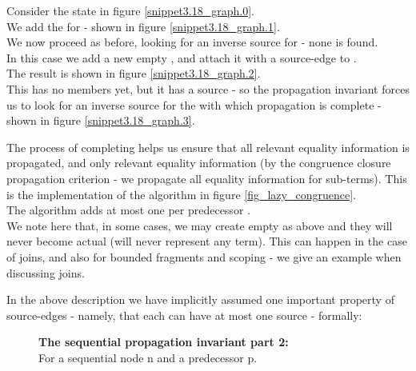 \bigskip
\noindent
Consider the state in figure \ref{snippet3.18_graph.0}.\\
We add the \GT{} for  - shown in figure \ref{snippet3.18_graph.1}.\\
We now proceed as before, looking for an inverse source for  - none is found.\\
In this case we add a new empty \GT{}, and attach it with a source-edge to .\\
The result is shown in figure \ref{snippet3.18_graph.2}.\\
This \GT{} has no members yet, but it has a source - so the propagation invariant forces us to look for an inverse source for the \GFA{} 
 with which propagation is complete - shown in figure \ref{snippet3.18_graph.3}.

\bigskip
\noindent
The process of completing \GFAs{} helps us ensure that all relevant equality information is propagated, and only relevant equality information (by the congruence closure propagation criterion - we propagate all equality information for sub-terms). This is the implementation of the algorithm in figure \ref{fig_lazy_congruence}.\\
The algorithm adds at most one \GT{} per predecessor \GT{}.\\
We note here that, in some cases, we may create empty \GTs{} as above and they will never become actual \GTs{} (will never represent any term). This can happen in the case of joins, and also for bounded fragments and scoping - we give an example when discussing joins.

\bigskip
\noindent
In the above description we have implicitly assumed one important property of source-edges - namely, that each \GT{} can have at most one source - formally:
\begin{figure}[H]
\textbf{The sequential propagation invariant part 2:}\\
For a sequential node n and a predecessor p.\\
\\
\end{figure}

